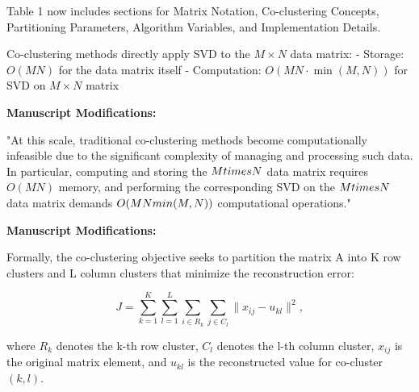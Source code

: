 \documentclass{ar2rc}
\begin{document}
Table 1 now includes sections for Matrix Notation, Co-clustering Concepts, Partitioning Parameters, Algorithm Variables, and Implementation Details.



Co-clustering methods directly apply SVD to the $M \times N$ data matrix:
- Storage: $O(MN)$ for the data matrix itself
- Computation: $O(MN \cdot \min(M,N))$ for SVD on $M \times N$ matrix

\textbf{Manuscript Modifications:}

"At this scale, traditional co-clustering methods become computationally infeasible due to the significant complexity of managing and processing such data. In particular, computing and storing the $M \\times N$ data matrix requires $O(MN)$ memory, and performing the corresponding SVD on the $M \\times N$ data matrix demands $O(MN\\min(M,N))$ computational operations."



\textbf{Manuscript Modifications:}

Formally, the co-clustering objective seeks to partition the matrix A into K row clusters and L column clusters that minimize the reconstruction error:

\begin{equation}
  J = \sum_{k=1}^{K} \sum_{l=1}^{L} \sum_{i \in R_k} \sum_{j \in C_l} \| x_{ij} - u_{kl} \|^2,
\end{equation}

where $R_k$ denotes the k-th row cluster, $C_l$ denotes the l-th column cluster, $x_{ij}$ is the original matrix element, and $u_{kl}$ is the reconstructed value for co-cluster $(k,l)$.
\end{document}
